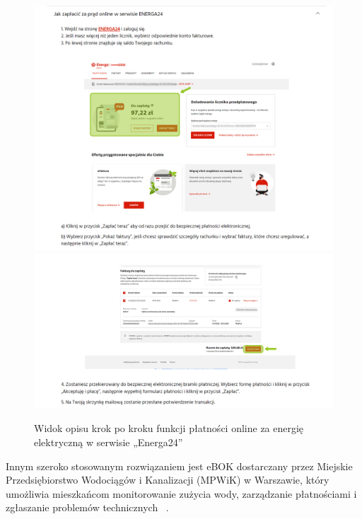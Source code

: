 \begin{figure}[htb]
	\centering
		\includegraphics[width=0.85\linewidth]{zrzuty_ekranu/energa_manual_1.png} \\[-1ex]
		\includegraphics[width=0.85\linewidth]{zrzuty_ekranu/energa_manual_2.png} \\[-1ex]
		\caption{Widok opisu krok po kroku funkcji płatności online za energię elektryczną w serwisie „Energa24”~\cite{energa}}
	\label{fig:energa_manual}
\end{figure}



Innym szeroko stosowanym rozwiązaniem jest eBOK dostarczany przez Miejskie Przedsiębiorstwo Wodociągów i Kanalizacji (MPWiK) w Warszawie, który umożliwia mieszkańcom monitorowanie zużycia wody, zarządzanie płatnościami i zgłaszanie problemów technicznych ~\cite{MPWiK}.

